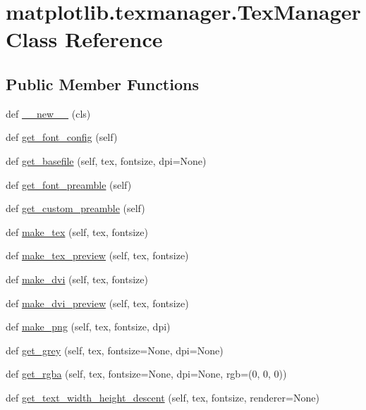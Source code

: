 \hypertarget{classmatplotlib_1_1texmanager_1_1TexManager}{}\section{matplotlib.\+texmanager.\+Tex\+Manager Class Reference}
\label{classmatplotlib_1_1texmanager_1_1TexManager}
\subsection*{Public Member Functions}
\begin{DoxyCompactItemize}
\item 
def \hyperlink{classmatplotlib_1_1texmanager_1_1TexManager_aa6f06ea2866afee73f338c1aeb755895}{\+\_\+\+\_\+new\+\_\+\+\_\+} (cls)
\item 
def \hyperlink{classmatplotlib_1_1texmanager_1_1TexManager_a711ab5a239f8f56fbc85183646815c6e}{get\+\_\+font\+\_\+config} (self)
\item 
def \hyperlink{classmatplotlib_1_1texmanager_1_1TexManager_a03141428360929b58e77467a3f4c59c6}{get\+\_\+basefile} (self, tex, fontsize, dpi=None)
\item 
def \hyperlink{classmatplotlib_1_1texmanager_1_1TexManager_ab43ee740fae545383cd6997c799db978}{get\+\_\+font\+\_\+preamble} (self)
\item 
def \hyperlink{classmatplotlib_1_1texmanager_1_1TexManager_aa90a386634056f52a0e84ed28aae966b}{get\+\_\+custom\+\_\+preamble} (self)
\item 
def \hyperlink{classmatplotlib_1_1texmanager_1_1TexManager_af9d1e50f4c1bbeb3429389057db4c53d}{make\+\_\+tex} (self, tex, fontsize)
\item 
def \hyperlink{classmatplotlib_1_1texmanager_1_1TexManager_ae1c73425b951e16b24e76cebec350614}{make\+\_\+tex\+\_\+preview} (self, tex, fontsize)
\item 
def \hyperlink{classmatplotlib_1_1texmanager_1_1TexManager_a646b85a21ef5205ea579b96ca69f4fb6}{make\+\_\+dvi} (self, tex, fontsize)
\item 
def \hyperlink{classmatplotlib_1_1texmanager_1_1TexManager_af09778e7d60c71661eb0d351ce13ada2}{make\+\_\+dvi\+\_\+preview} (self, tex, fontsize)
\item 
def \hyperlink{classmatplotlib_1_1texmanager_1_1TexManager_a6c81a8c74ea6a3fc9727d91cae1cba99}{make\+\_\+png} (self, tex, fontsize, dpi)
\item 
def \hyperlink{classmatplotlib_1_1texmanager_1_1TexManager_a53f29971a9643757fed98688b5eeeafc}{get\+\_\+grey} (self, tex, fontsize=None, dpi=None)
\item 
def \hyperlink{classmatplotlib_1_1texmanager_1_1TexManager_af115a6c2dbf3e3141600aacace3350fa}{get\+\_\+rgba} (self, tex, fontsize=None, dpi=None, rgb=(0, 0, 0))
\item 
def \hyperlink{classmatplotlib_1_1texmanager_1_1TexManager_ac8b7649cd4ec2f8046a7693b97c60c01}{get\+\_\+text\+\_\+width\+\_\+height\+\_\+descent} (self, tex, fontsize, renderer=None)
\end{DoxyCompactItemize}
